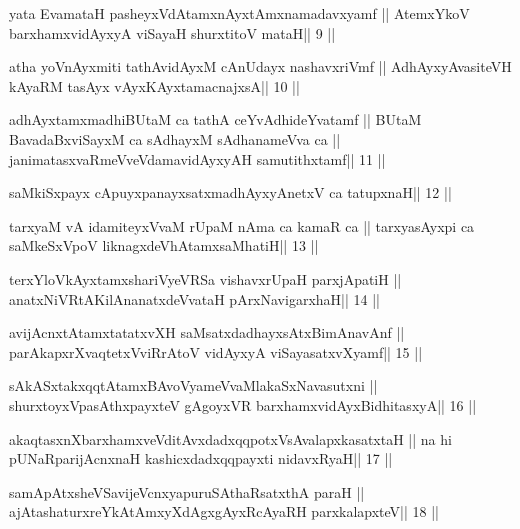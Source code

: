 \begin{shl}
yata EvamataH pasheyxVdAtamxnAyxtAmxnamadavxyamf ||
AtemxYkoV barxhamxvidAyxyA viSayaH shurxtitoV mataH\hfill || 9 ||
\end{shl}

\begin{shl}
atha yoV\s nAyxmiti tathA\s vidAyxM cAnUdayx nashavxriVmf ||
A\s dhAyxyAvasiteVH kAyaRM tasAyx vAyxKAyxtamacnajxsA\hfill || 10 ||
\end{shl}

\begin{shl}
adhAyxtamxmadhiBUtaM ca tathA ceYvAdhideYvatamf ||
BUtaM BavadaBxviSayxM ca sAdhayxM sAdhanameVva ca ||
janimatasxvaRmeVveVdamavidAyxyAH samutithxtamf\hfill || 11 ||
\end{shl}

\begin{shl}
saMkiSxpayx cApuyxpanayxsatxmadhAyxyAnetxV ca tatupxnaH\hfill || 12 ||
\end{shl}

\begin{shl}
tarxyaM vA idamiteyxVvaM rUpaM nAma ca kamaR ca ||
tarxyasAyxpi ca saMkeSxVpoV liknagxdeVhAtamxsaMhatiH\hfill || 13 ||
\end{shl}

\begin{shl}
terxYloVkAyxtamxshariVyeVRSa vishavxrUpaH parxjApatiH ||
anatxNiVRtAKilAnanatxdeVvataH pArxNavigarxhaH\hfill || 14 ||
\end{shl}

\begin{shl}
avijAcnxtAtamxtatatxvXH saMsatxdadhayxsAtxBimAnavAnf ||
parAkapxrXvaqtetxVviRrAtoV vidAyxyA viSayasatxvXyamf\hfill || 15 ||
\end{shl}

\begin{shl}
sAkASxtakxqqtAtamxBAvoV\s yameVvaMlakaSxNavasutxni ||
shurxtoyxVpasAthxpayxteV gAgoyxVR barxhamxvidAyxBidhitasxyA\hfill || 16 ||
\end{shl}

\begin{shl}
akaqtasxnXbarxhamxveVditAvxdadxqqpotxV\s sAvalapxkasatxtaH ||
na hi pUNaRparijAcnxnaH kashicxdadxqqpayxti nidavxRyaH\hfill || 17 ||
\end{shl}

\begin{shl}
samApAtxsheVSavijeVcnxyapuruSAthaRsatxthA paraH ||
ajAtashaturxreYkAtAmxyXdAgxgAyxRcAyaRH parxkalapxteV\hfill || 18 ||
\end{shl}

